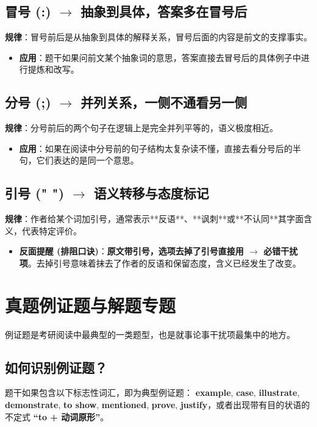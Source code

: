 \documentclass[cn,normal,11pt]{elegantnote}
\newcommand{\retrokey}[1]{{\color{accentcolor}\textbf{#1}}}
\begin{document}
\subsection{冒号 (:) \ensuremath{\rightarrow} 抽象到具体，答案多在冒号后}
\textbf{规律}：冒号前后是从抽象到具体的解释关系，冒号后面的内容是前文的支撑事实。
\begin{itemize}
  \item \textbf{应用}：题干如果问前文某个抽象词的意思，答案直接去冒号后的具体例子中进行提炼和改写。
\end{itemize}

\subsection{分号 (;) \ensuremath{\rightarrow} 并列关系，一侧不通看另一侧}
\textbf{规律}：分号前后的两个句子在逻辑上是完全并列平等的，语义极度相近。
\begin{itemize}
  \item \textbf{应用}：如果在阅读中分号前的句子结构太复杂读不懂，直接去看分号后的半句，它们表达的是同一个意思。
\end{itemize}

\subsection{引号 (" ") \ensuremath{\rightarrow} 语义转移与态度标记}
\textbf{规律}：作者给某个词加引号，通常表示**反语**、**讽刺**或**不认同**其字面含义，代表特定评价。
\begin{itemize}
  \item \retrokey{反面提醒 (排阻口诀)}：\textbf{原文带引号，选项去掉了引号直接用 $\rightarrow$ 必错干扰项}。去掉引号意味着抹去了作者的反语和保留态度，含义已经发生了改变。
\end{itemize}

\section{真题例证题与解题专题}
例证题是考研阅读中最典型的一类题型，也是就事论事干扰项最集中的地方。

\subsection{如何识别例证题？}
题干如果包含以下标志性词汇，即为典型例证题：
\textbf{example}, \textbf{case}, \textbf{illustrate}, \textbf{demonstrate}, \textbf{to show}, \textbf{mentioned}, \textbf{prove}, \textbf{justify}，或者出现带有目的状语的不定式 \retrokey{“to + 动词原形”}。
\end{document}

